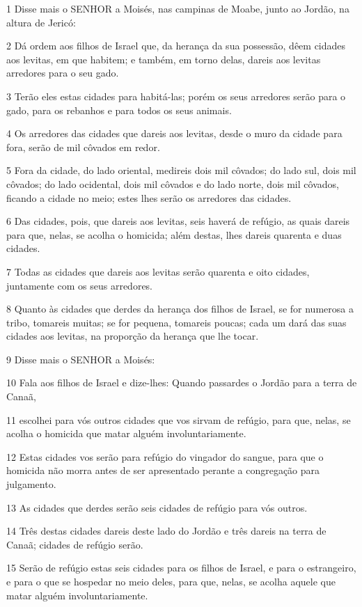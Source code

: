 \par 1 Disse mais o SENHOR a Moisés, nas campinas de Moabe, junto ao Jordão, na altura de Jericó:
\par 2 Dá ordem aos filhos de Israel que, da herança da sua possessão, dêem cidades aos levitas, em que habitem; e também, em torno delas, dareis aos levitas arredores para o seu gado.
\par 3 Terão eles estas cidades para habitá-las; porém os seus arredores serão para o gado, para os rebanhos e para todos os seus animais.
\par 4 Os arredores das cidades que dareis aos levitas, desde o muro da cidade para fora, serão de mil côvados em redor.
\par 5 Fora da cidade, do lado oriental, medireis dois mil côvados; do lado sul, dois mil côvados; do lado ocidental, dois mil côvados e do lado norte, dois mil côvados, ficando a cidade no meio; estes lhes serão os arredores das cidades.
\par 6 Das cidades, pois, que dareis aos levitas, seis haverá de refúgio, as quais dareis para que, nelas, se acolha o homicida; além destas, lhes dareis quarenta e duas cidades.
\par 7 Todas as cidades que dareis aos levitas serão quarenta e oito cidades, juntamente com os seus arredores.
\par 8 Quanto às cidades que derdes da herança dos filhos de Israel, se for numerosa a tribo, tomareis muitas; se for pequena, tomareis poucas; cada um dará das suas cidades aos levitas, na proporção da herança que lhe tocar.
\par 9 Disse mais o SENHOR a Moisés:
\par 10 Fala aos filhos de Israel e dize-lhes: Quando passardes o Jordão para a terra de Canaã,
\par 11 escolhei para vós outros cidades que vos sirvam de refúgio, para que, nelas, se acolha o homicida que matar alguém involuntariamente.
\par 12 Estas cidades vos serão para refúgio do vingador do sangue, para que o homicida não morra antes de ser apresentado perante a congregação para julgamento.
\par 13 As cidades que derdes serão seis cidades de refúgio para vós outros.
\par 14 Três destas cidades dareis deste lado do Jordão e três dareis na terra de Canaã; cidades de refúgio serão.
\par 15 Serão de refúgio estas seis cidades para os filhos de Israel, e para o estrangeiro, e para o que se hospedar no meio deles, para que, nelas, se acolha aquele que matar alguém involuntariamente.
